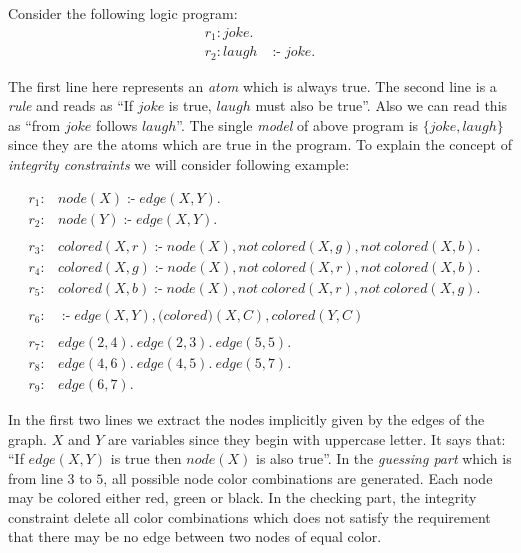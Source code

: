 \documentclass[a4paper, titlepage]{article}
\DeclareMathOperator{\leftimpl}{:-}
\begin{document}
\begin{exmp} 
Consider the following logic program:
\begin{align*}
r_1\colon\mathit{ joke }.& \\
r_2\colon\mathit{ laugh } & \leftimpl \mathit{ joke }.
\end{align*} 
\end{exmp}
The first line here represents an \emph{atom} which is 
always true. The second line is a \emph{rule} and reads as 
\enquote{If $\mathit{joke}$ is true, $\mathit{laugh}$ must 
also be true}. Also we can read this as \enquote{from 
$\mathit{joke}$ follows $\mathit{laugh}$}. The single 
\emph{model} of above program is $\{\mathit{joke}, 
\mathit{laugh}\}$ since they are the atoms which are true 
in the program. To explain the concept of \emph{integrity 
constraints} we will consider following example:
\begin{exmp}
\label{nodecoloring}
\begin{align*}
r_1\colon & \mathit{node}(X) \leftimpl \mathit{edge}(X, Y). 
&\\
r_2\colon & \mathit{node}(Y) \leftimpl \mathit{edge}(X, Y). 
& \\
\\
r_3\colon & \mathit{colored}(X, r) \leftimpl \mathit{node}(X), not \  colored(X,g),not \ colored(X,b). & \\
r_4\colon & \mathit{colored}(X, g) \leftimpl \mathit{node}(X), not \  colored(X,r),not \ colored(X,b). & \\
r_5\colon & \mathit{colored}(X, b) \leftimpl \mathit{node}(X), not \  colored(X,r),not \ colored(X,g). & \\
\\
r_6\colon & \leftimpl \mathit{edge}(X, Y), \mathit(colored)
(X, C), \mathit{colored}(Y, C) & \\
\\
r_7\colon & \mathit{edge}(2, 4). \  \mathit{edge}(2, 3). \  
\mathit{edge}(5, 5). & \\
r_8\colon & \mathit{edge}(4, 6). \  \mathit{edge}(4, 5). \ 
\mathit{edge}(5, 7). & \\
r_9\colon & \mathit{edge}(6, 7). &
\end{align*} 
\end{exmp}
In the first two lines we extract the nodes implicitly given by the edges of the graph.
$X$ and $Y$ are 
variables since they begin with uppercase letter. It says 
that: \enquote{If $\mathit{edge}(X,Y)$ is true then 
$\mathit{node(X)}$ is also true}. In the 
\emph{guessing part} which is from line $3$ to $5$, all possible node color combinations 
are generated. Each node may be colored either red, 
green or black. In the checking part, the integrity constraint 
delete all color combinations which does not satisfy the 
requirement that there may be no edge between two nodes of 
equal color. 
\end{document}
